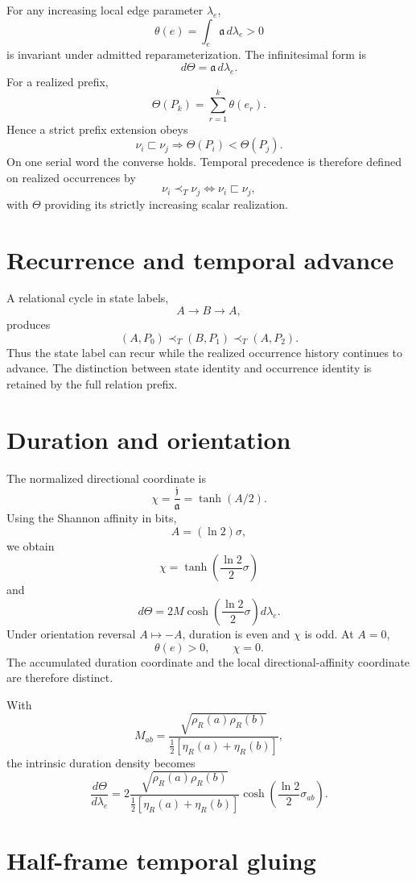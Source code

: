 \documentclass[11pt]{book}
\begin{document}
For any increasing local edge parameter $\lambda_e$,
\[
\boxed{
\theta(e)=\int_e\mathfrak a\,d\lambda_e>0
}
\]
is invariant under admitted reparameterization. The infinitesimal form is
\[
\boxed{d\Theta=\mathfrak a\,d\lambda_e.}
\]
For a realized prefix,
\[
\boxed{
\Theta(P_k)=\sum_{r=1}^{k}\theta(e_r).
}
\]
Hence a strict prefix extension obeys
\[
\boxed{
\nu_i\sqsubset\nu_j
\Longrightarrow
\Theta(P_i)<\Theta(P_j).
}
\]
On one serial word the converse holds. Temporal precedence is therefore defined on realized occurrences by
\[
\boxed{
\nu_i\prec_T\nu_j
\iff
\nu_i\sqsubset\nu_j,
}
\]
with $\Theta$ providing its strictly increasing scalar realization.

\section{Recurrence and temporal advance}

A relational cycle in state labels,
\[
A\to B\to A,
\]
produces
\[
(A,P_0)\prec_T(B,P_1)\prec_T(A,P_2).
\]
Thus the state label can recur while the realized occurrence history continues to advance. The distinction between state identity and occurrence identity is retained by the full relation prefix.

\section{Duration and orientation}

The normalized directional coordinate is
\[
\boxed{
\chi=\frac{\mathfrak j}{\mathfrak a}=\tanh(A/2).
}
\]
Using the Shannon affinity in bits,
\[
A=(\ln2)\sigma,
\]
we obtain
\[
\boxed{
\chi=\tanh\!\left(\frac{\ln2}{2}\sigma\right)
}
\]
and
\[
\boxed{
d\Theta=2M\cosh\!\left(\frac{\ln2}{2}\sigma\right)d\lambda_e.}
\]
Under orientation reversal $A\mapsto-A$, duration is even and $\chi$ is odd. At $A=0$,
\[
\boxed{\theta(e)>0,\qquad \chi=0.}
\]
The accumulated duration coordinate and the local directional-affinity coordinate are therefore distinct.

With
\[
M_{ab}
=\frac{\sqrt{\rho_R(a)\rho_R(b)}}{\tfrac12[\eta_R(a)+\eta_R(b)]},
\]
the intrinsic duration density becomes
\[
\boxed{
\frac{d\Theta}{d\lambda_e}
=
2\frac{\sqrt{\rho_R(a)\rho_R(b)}}{\tfrac12[\eta_R(a)+\eta_R(b)]}
\cosh\!\left(\frac{\ln2}{2}\sigma_{ab}\right).
}
\]

\section{Half-frame temporal gluing}
\end{document}
